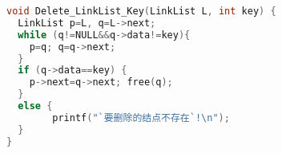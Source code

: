 \begin{lstlisting}[language=C]
void Delete_LinkList_Key(LinkList L, int key) {
  LinkList p=L, q=L->next;  
  while (q!=NULL&&q->data!=key){
    p=q; q=q->next;   
  }
  if (q->data==key) {
    p->next=q->next; free(q);
  }
  else {
        printf("`要删除的结点不存在`!\n");
  }
}
\end{lstlisting}
